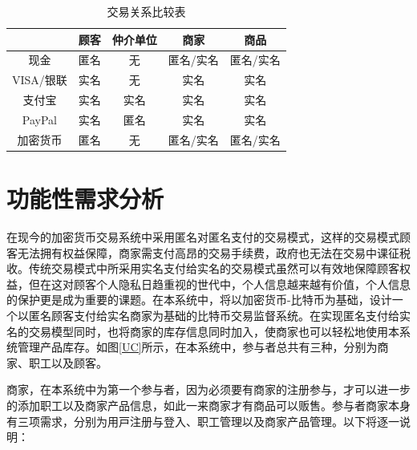 		\begin{table}[!htb]
		\centering
		\caption{交易关系比较表}
		\label{txvs}
		\begin{tabular}{|c|c|c|c|c|}
		\hline
		 & 顾客 & 仲介单位 & 商家 & 商品 \\ \hline
		现金 & 匿名 & 无 & 匿名/实名 & 匿名/实名 \\ \hline
		VISA/银联 & 实名 & 无 & 实名 & 实名 \\ \hline
		支付宝 & 实名 & 实名 & 实名 & 实名 \\ \hline
		PayPal & 实名 & 匿名 & 实名 & 实名 \\ \hline
		加密货币 & 匿名 & 无 & 匿名/实名 & 匿名/实名 \\ \hline
		\end{tabular}
		\end{table}

\section{功能性需求分析}

在现今的加密货币交易系统中采用匿名对匿名⽀付的交易模式，这样的交易模式顾客无法拥有权益保障，商家需支付高昂的交易手续费，政府也无法在交易中课征税收。传统交易模式中所采用实名⽀付给实名的交易模式虽然可以有效地保障顾客权益，但在这对顾客个⼈隐私⽇趋重视的世代中，个⼈信息越来越有价值，个⼈信息的保护更是成为重要的课题。在本系统中，将以加密货币-⽐特币为基础，设计⼀个以匿名顾客⽀付给实名商家为基础的比特币交易监督系统。在实现匿名⽀付给实名的交易模型同时，也将商家的库存信息同时加⼊，使商家也可以轻松地使用本系统管理产品库存。如图\ref{UC}所示，在本系统中，参与者总共有三种，分别为商家、职⼯以及顾客。

商家，在本系统中为第⼀个参与者，因为必须要有商家的注册参与，才可以进⼀步的添加职⼯以及商家产品信息，如此⼀来商家才有商品可以贩售。参与者商家本⾝有三项需求，分别为⽤⼾注册与登⼊、职⼯管理以及商家产品管理。以下将逐⼀说明：


